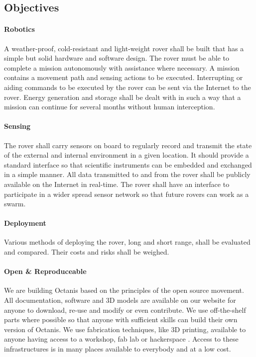 \documentclass[a4paper,12pt]{article}
\begin{document}
\subsection{Objectives}


\paragraph{Robotics}
A weather-proof, cold-resistant and light-weight rover shall be built that has a simple but solid hardware and software design. The rover must be able to complete a mission autonomously with assistance where necessary. A mission contains a movement path and sensing actions to be executed. Interrupting or aiding commands to be executed by the rover can be sent via the Internet to the rover. Energy generation and storage shall be dealt with in such a way that a mission can continue for several months without human interception.

\paragraph{Sensing}
The rover shall carry sensors on board to regularly record and transmit the state of the external and internal environment in a given location. It should provide a standard interface so that scientific instruments can be embedded and exchanged in a simple manner. All data transmitted to and from the rover shall be publicly available on the Internet in real-time. The rover shall have an interface to participate in a wider spread sensor network so that future rovers can work as a swarm.

\paragraph{Deployment}
Various methods of deploying the rover, long and short range, shall be evaluated and compared. Their costs and risks shall be weighed.


\paragraph{Open \& Reproduceable} 
We are building Octanis based on the principles of the open source movement. All documentation, software and 3D models are available on our website for anyone to download, re-use and modify or even contribute. We use off-the-shelf parts where possible so that anyone with sufficient skills can build their own version of Octanis. We use fabrication techniques, like 3D printing, available to anyone having access to a workshop, fab lab \cite{fablab} or hackerspace \cite{hackerspace}. Access to these infrastructures is in many places available to everybody and at a low cost.
 
\end{document}
